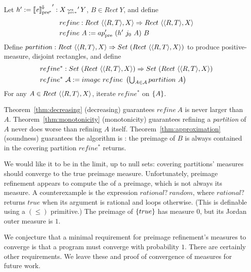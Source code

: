 \documentclass{llncs}
\newcommand{\arrow}{\rightsquigarrow}
\newcommand{\conv}{^{\mspace{-2mu}\Downarrow\mspace{-2mu}}}
\newcommand{\meaningofconv}[1]{\left\llbracket{#1}\right\rrbracket\conv}
\newcommand{\pre}{_\mathrm{pre}}
\newcommand{\ppre}{_\mathrm{pre^{\mspace{-2mu}*}}}
\DeclareMathOperator{\ppreto}{\arrow_{\mspace{-19mu}_{\mathrm{pre*}}}}
\begin{document}
\begin{definition}
\label{def:preimage-refinement}
Let $h' := {\meaningofconv{\mathit{e}}\ppre}' : X \ppreto' Y$, $B \in Rect~Y$, and define
\begin{equation}
\begin{aligned}
	&refine : Rect~\pair{\pair{R,T},X} \tto Rect~\pair{\pair{R,T},X} \\
	&refine~A := ap\pre'~(h'~j_0~A)~B
\end{aligned}
\end{equation}
Define $partition : Rect~\langle{\langle{R,T}\rangle,X}\rangle \Rightarrow Set~(Rect~\langle{\langle{R,T}\rangle,X}\rangle)$ to produce positive-measure, disjoint rectangles, and define
\begin{equation}
\begin{aligned}
	&refine^* : Set~(Rect~\langle{\langle{R,T}\rangle,X}\rangle) \Rightarrow Set~(Rect~\langle{\langle{R,T}\rangle,X}\rangle) \\
	&refine^*~\mathcal{A} := image~refine~\left(\textstyle\bigcup_{A \in \mathcal{A}} partition~A \right)
\end{aligned}
\end{equation}
For any $A \in Rect~\langle{\langle{R,T}\rangle,X}\rangle$, iterate $refine^*$ on $\{{A}\}$.
\end{definition}

Theorem~\ref{thm:decreasing} (decreasing) guarantees $refine~A$ is never larger than $A$.
Theorem~\ref{thm:monotonicity} (monotonicity) guarantees refining a \emph{partition} of $A$ never does worse than refining $A$ itself.
Theorem~\ref{thm:approximation} (soundness) guarantees the algorithm is : the preimage of $B$ is always contained in the covering partition $refine^*$ returns.

We would like it to be  in the limit, up to null sets: covering partitions' measures should converge to the true preimage measure.
Unfortunately, preimage refinement appears to compute the  of a preimage, which is not always its measure.
A counterexample is the expression $rational?~random$, where $rational?$ returns $true$ when its argument is rational and loops otherwise.
(This is definable using a $(\leq)$ primitive.)
The preimage of $\{{true}\}$ has measure $0$, but its Jordan outer measure is $1$.

We conjecture that a minimal requirement for preimage refinement's measures to converge is that a program must converge with probability $1$.
There are certainly other requirements.
We leave these and proof of convergence of measures for future work.
\end{document}
